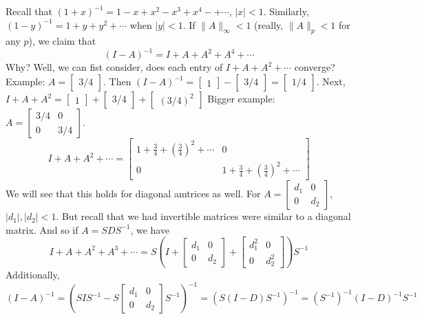 \documentclass{article}
\theoremstyle{plain}
\theoremstyle{remark}
\begin{document}
Recall that $(1+x)^{-1} = 1 - x + x^2 - x^3 + x^4 -+ \cdots$, $|x| < 1$.
Similarly, $(1-y)^{-1} = 1 + y + y^2 + \cdots$ when $|y| < 1$.
If $\lVert A \rVert_\infty < 1$ (really, $\lVert A \rVert_p < 1$ for any $p$),
we claim that
\[
	(I - A)^{-1} = I + A + A^2 + A^4 + \cdots
\]
Why? Well, we can fist consider, does each entry of $I + A + A^2 + \cdots$ converge?
Example: $A = \begin{bmatrix} 3/4 \end{bmatrix}$.
Then $(I - A)^{-1} = \begin{bmatrix} 1 \end{bmatrix}
- \begin{bmatrix} 3/4 \end{bmatrix} = \begin{bmatrix} 1/4 \end{bmatrix}$.
Next, $I + A + A^2 = \begin{bmatrix} 1 \end{bmatrix} + \begin{bmatrix} 3/4 \end{bmatrix} +
\begin{bmatrix} (3/4)^2 \end{bmatrix}$
Bigger example: $A = \begin{bmatrix} 3/4 & 0 \\ 0 & 3/4 \end{bmatrix}$.
\[
	I + A + A^2 + \cdots =
	\begin{bmatrix} 1 + \frac34 + (\frac34)^2 + \cdots & 0\\
	0 & 1 + \frac34 + (\frac34)^2 + \cdots \end{bmatrix}
\]
We will see that this holds for diagonal amtrices as well.
For $A = \begin{bmatrix} d_1 & 0 \\ 0 & d_2 \end{bmatrix}$, $|d_1|,|d_2| < 1$.
But recall that we had invertible matrices were similar to a diagonal matrix.
And so if $A = SDS^{-1}$, we have
\[
	I + A + A^2 + A^3 + \cdots
	= S\left(I + \begin{bmatrix} d_1 & 0 \\ 0 & d_2 \end{bmatrix}
	+ \begin{bmatrix} d_1^2 & 0 \\ 0 & d_2^2 \end{bmatrix}\right)S^{-1}
\]
Additionally,
\[
	(I-A)^{-1}
	= \left(SIS^{-1} - S\begin{bmatrix} d_1 & 0 \\ 0 & d_2 \end{bmatrix}S^{-1}\right)^{-1}
	= \left(S\left(I - D\right)S^{-1}\right)^{-1}
	= (S^{-1})^{-1}(I - D)^{-1}S^{-1}
\]
\end{document}
